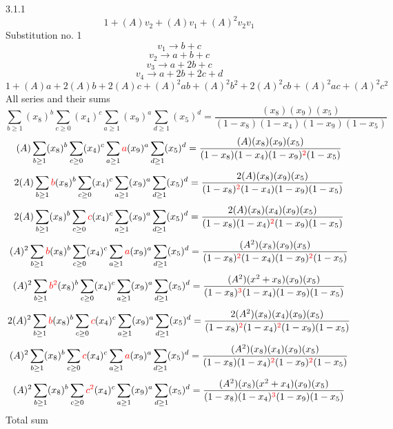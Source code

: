 \documentclass{article}
\begin{document}
                
3.1.1
\[1+(A)v_2+(A)v_1+(A)^2v_2v_1\]Substitution no. 1\[v_1\rightarrow{b+c}\]\[v_2\rightarrow{a+b+c}\]\[v_3\rightarrow{a+2b+c}\]\[v_4\rightarrow{a+2b+2c+d}\]\[1+(A)a+2(A)b+2(A)c+(A)^2ab+(A)^2b^{2}+2(A)^2cb+(A)^2ac+(A)^2c^{2}\]All series and their sums\[\sum_{b\geq{1}}(x_8)^{b}\sum_{c\geq{0}}(x_4)^{c}\sum_{a\geq{1}}(x_9)^{a}\sum_{d\geq{1}}(x_5)^{d}=\frac{(x_8)(x_9)(x_5)}{(1-x_8)(1-x_4)(1-x_9)(1-x_5)}\]\[(A)\sum_{b\geq{1}}(x_8)^{b}\sum_{c\geq{0}}(x_4)^{c}\sum_{a\geq{1}}\textcolor{red}{a}(x_9)^{a}\sum_{d\geq{1}}(x_5)^{d}=\frac{(A)(x_8)(x_9)(x_5)}{(1-x_8)(1-x_4)(1-x_9)^{\textcolor{red}{2}}(1-x_5)}\]\[2(A)\sum_{b\geq{1}}\textcolor{red}{b}(x_8)^{b}\sum_{c\geq{0}}(x_4)^{c}\sum_{a\geq{1}}(x_9)^{a}\sum_{d\geq{1}}(x_5)^{d}=\frac{2(A)(x_8)(x_9)(x_5)}{(1-x_8)^{\textcolor{red}{2}}(1-x_4)(1-x_9)(1-x_5)}\]\[2(A)\sum_{b\geq{1}}(x_8)^{b}\sum_{c\geq{0}}\textcolor{red}{c}(x_4)^{c}\sum_{a\geq{1}}(x_9)^{a}\sum_{d\geq{1}}(x_5)^{d}=\frac{2(A)(x_8)(x_4)(x_9)(x_5)}{(1-x_8)(1-x_4)^{\textcolor{red}{2}}(1-x_9)(1-x_5)}\]\[(A)^{2}\sum_{b\geq{1}}\textcolor{red}{b}(x_8)^{b}\sum_{c\geq{0}}(x_4)^{c}\sum_{a\geq{1}}\textcolor{red}{a}(x_9)^{a}\sum_{d\geq{1}}(x_5)^{d}=\frac{(A^{2})(x_8)(x_9)(x_5)}{(1-x_8)^{\textcolor{red}{2}}(1-x_4)(1-x_9)^{\textcolor{red}{2}}(1-x_5)}\]\[(A)^{2}\sum_{b\geq{1}}\textcolor{red}{b^{2}}(x_8)^{b}\sum_{c\geq{0}}(x_4)^{c}\sum_{a\geq{1}}(x_9)^{a}\sum_{d\geq{1}}(x_5)^{d}=\frac{(A^{2})(x^{2}+x_8)(x_9)(x_5)}{(1-x_8)^{\textcolor{red}{3}}(1-x_4)(1-x_9)(1-x_5)}\]\[2(A)^{2}\sum_{b\geq{1}}\textcolor{red}{b}(x_8)^{b}\sum_{c\geq{0}}\textcolor{red}{c}(x_4)^{c}\sum_{a\geq{1}}(x_9)^{a}\sum_{d\geq{1}}(x_5)^{d}=\frac{2(A^{2})(x_8)(x_4)(x_9)(x_5)}{(1-x_8)^{\textcolor{red}{2}}(1-x_4)^{\textcolor{red}{2}}(1-x_9)(1-x_5)}\]\[(A)^{2}\sum_{b\geq{1}}(x_8)^{b}\sum_{c\geq{0}}\textcolor{red}{c}(x_4)^{c}\sum_{a\geq{1}}\textcolor{red}{a}(x_9)^{a}\sum_{d\geq{1}}(x_5)^{d}=\frac{(A^{2})(x_8)(x_4)(x_9)(x_5)}{(1-x_8)(1-x_4)^{\textcolor{red}{2}}(1-x_9)^{\textcolor{red}{2}}(1-x_5)}\]\[(A)^{2}\sum_{b\geq{1}}(x_8)^{b}\sum_{c\geq{0}}\textcolor{red}{c^{2}}(x_4)^{c}\sum_{a\geq{1}}(x_9)^{a}\sum_{d\geq{1}}(x_5)^{d}=\frac{(A^{2})(x_8)(x^{2}+x_4)(x_9)(x_5)}{(1-x_8)(1-x_4)^{\textcolor{red}{3}}(1-x_9)(1-x_5)}\]
Total sum
\end{document}
